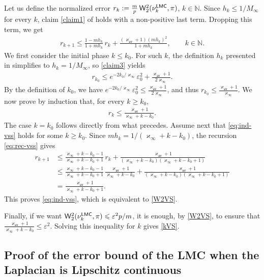 \documentclass[aos,reqno]{imsart}
\def\wass{\mathsf{W}}
\def\kappav{\varkappa_{\textsf{av}}}
\def\kappamax{\varkappa_{\infty}}
\def\Mmax{M_{\infty}}
\theoremstyle{definition}
\begin{document}
Let us define the normalized error $
r_k:=\frac{m}{p}\,\wass_2^2(\nu_k^{\sf LMC},\pi)$, 
$k\in\mathbb N$. Since $h_k\leqslant 1/\Mmax$ for 
every $k$, claim \eqref{claim1} of  holds
with a non-positive last term. Dropping this term, 
we get
\begin{align}\label{eq:rec-vss}
    r_{k+1}\leqslant
    \frac{1-mh_k}{1+mh_k}\,r_k
    +\frac{(\kappav+1)(mh_k)^2}{1+mh_k},
    \qquad k\in\mathbb N.
\end{align}
We first consider the initial phase $k\leqslant k_0$.
For such $k$, the definition $h_k$ presented in 
 simplifies to $h_k=1/\Mmax$, so 
\eqref{claim3} yields
\begin{align}
r_{k_0}\leqslant
 e^{-2k_0/\kappamax}\varepsilon_0^2
 +\frac{\kappav+1}{2\kappamax}.
\end{align}
By the definition of $k_0$, we have
$e^{-2k_0/\kappamax}\varepsilon_0^2
\leqslant \frac{\kappav+1}{2\kappamax}$,
and thus $r_{k_0}\leqslant \frac{\kappav+1}{
\kappamax}$. We now prove by induction that, 
for every $k\geqslant k_0$,
\begin{align}\label{eq:ind-vss}
    r_k\leqslant
    \frac{\kappav+1}{\kappamax+k-k_0}.
\end{align}
The case $k=k_0$ follows directly from
what precedes. Assume next that
\eqref{eq:ind-vss} holds for some $k\geqslant k_0$.
Since $mh_k = {1}/{(\kappamax+k-k_0)}$,
the recursion \eqref{eq:rec-vss} gives
\begin{align}
    r_{k+1}
    &\leqslant
    \frac{\kappamax+k-k_0-1}{\kappamax+k-k_0+1}\,r_k
    +\frac{\kappav+1}
    {(\kappamax+k-k_0)(\kappamax+k-k_0+1)}
    \\
    &\leqslant
    \frac{\kappamax+k-k_0-1}{\kappamax+k-k_0+1}\,
    \frac{\kappav+1}{\kappamax+k-k_0}
    +\frac{\kappav+1}
    {(\kappamax+k-k_0)(\kappamax+k-k_0+1)}
    \\
    &=\frac{\kappav+1}{\kappamax+k-k_0+1}.
\end{align}
This proves \eqref{eq:ind-vss}, which is equivalent to
\eqref{W2VS}.

Finally, if we want
$\wass_2^2(\nu_k^{\sf LMC},\pi)\leqslant \varepsilon^2 p/m$,
it is enough, by \eqref{W2VS}, to ensure that
$\frac{\kappav+1}{\kappamax+k-k_0}\leqslant \varepsilon^2$. 
Solving this inequality for $k$ gives \eqref{kVS}.

\subsection{Proof of the error bound of the LMC when
the Laplacian is Lipschitz continuous}
\end{document}
